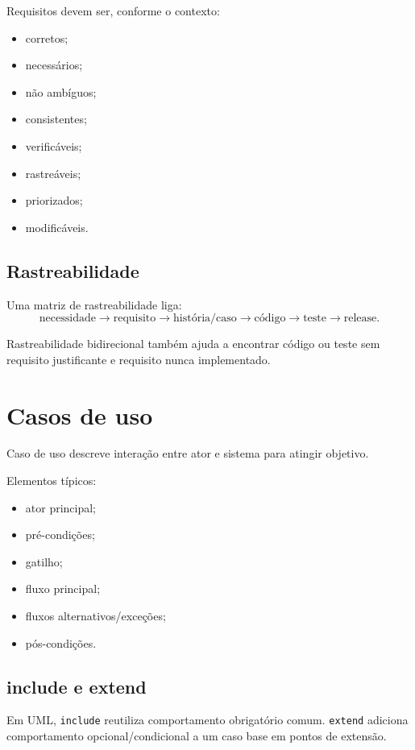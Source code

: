 Requisitos devem ser, conforme o contexto:
\begin{itemize}
\item corretos;
\item necessários;
\item não ambíguos;
\item consistentes;
\item verificáveis;
\item rastreáveis;
\item priorizados;
\item modificáveis.
\end{itemize}

\subsection{Rastreabilidade}

Uma matriz de rastreabilidade liga:
\[
\text{necessidade}\rightarrow
\text{requisito}\rightarrow
\text{história/caso}\rightarrow
\text{código}\rightarrow
\text{teste}\rightarrow
\text{release}.
\]

Rastreabilidade bidirecional também ajuda a encontrar código ou teste sem requisito justificante e requisito nunca implementado.

\section{Casos de uso}

Caso de uso descreve interação entre ator e sistema para atingir objetivo.

Elementos típicos:
\begin{itemize}
\item ator principal;
\item pré-condições;
\item gatilho;
\item fluxo principal;
\item fluxos alternativos/exceções;
\item pós-condições.
\end{itemize}

\subsection{include e extend}

Em UML, \texttt{include} reutiliza comportamento obrigatório comum. \texttt{extend} adiciona comportamento opcional/condicional a um caso base em pontos de extensão.


